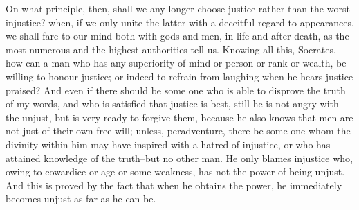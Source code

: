 On what principle, then, shall we any longer choose justice rather than
the worst injustice? when, if we only unite the latter with a deceitful
regard to appearances, we shall fare to our mind both with gods and
men, in life and after death, as the most numerous and the highest
authorities tell us. Knowing all this, Socrates, how can a man who
has any superiority of mind or person or rank or wealth, be willing to
honour justice; or indeed to refrain from laughing when he hears justice
praised? And even if there should be some one who is able to disprove
the truth of my words, and who is satisfied that justice is best, still
he is not angry with the unjust, but is very ready to forgive them,
because he also knows that men are not just of their own free will;
unless, peradventure, there be some one whom the divinity within him may
have inspired with a hatred of injustice, or who has attained knowledge
of the truth--but no other man. He only blames injustice who, owing to
cowardice or age or some weakness, has not the power of being unjust.
And this is proved by the fact that when he obtains the power, he
immediately becomes unjust as far as he can be.

